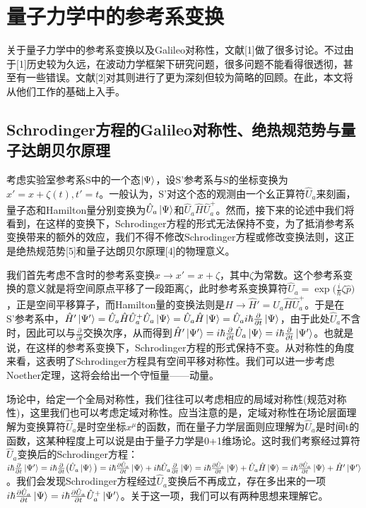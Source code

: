 \documentclass[a4paper]{article}
\begin{document}
    \section{量子力学中的参考系变换}

        关于量子力学中的参考系变换以及Galileo对称性，文献[1]做了很多讨论。不过由于[1]历史较为久远，在波动力学框架下研究问题，很多问题不能看得很透彻，甚至有一些错误。文献[2]对其则进行了更为深刻但较为简略的回顾。在此，本文将从他们工作的基础上入手。

    \subsection{Schrodinger方程的Galileo对称性、绝热规范势与量子达朗贝尔原理}
        考虑实验室参考系S中的一个态$\ket{\Psi}$，设S'参考系与S的坐标变换为$x'=x+\zeta(t), t'=t$。一般认为，S'对这个态的观测由一个幺正算符$\hat{U}_a$来刻画，量子态和Hamilton量分别变换为$\hat{U}_a\ket{\Psi}$和$\hat{U}_a\hat{H}\hat{U}_a^+$。然而，接下来的论述中我们将看到，在这样的变换下，Schrodinger方程的形式无法保持不变，为了抵消参考系变换带来的额外的效应，我们不得不修改Schrodinger方程或修改变换法则，这正是绝热规范势[5]和量子达朗贝尔原理[4]的物理意义。

        我们首先考虑不含时的参考系变换$x\rightarrow x'=x+\zeta$，其中$\zeta$为常数。这个参考系变换的意义就是将空间原点平移了一段距离$\zeta$，此时参考系变换算符$\hat{U}_a=\exp\big(\frac{i}{\hbar}\zeta\hat{p} \big)$，正是空间平移算子，而Hamilton量的变换法则是$\hat{H}\rightarrow \hat{H}'=\hat{U}_a\hat{H}\hat{U}_a^+$。于是在S'参考系中，$\hat{H}'\ket{\Psi'}=\hat{U}_a\hat{H}\hat{U}_a^+\hat{U}_a\ket{\Psi}=\hat{U}_a\hat{H}\ket{\Psi}=\hat{U}_a i\hbar\frac{\partial}{\partial t}\ket{\Psi}$，由于此处$\hat{U}_a$不含时，因此可以与$\frac{\partial}{\partial t}$交换次序，从而得到$\hat{H}'\ket{\Psi'}=i\hbar\frac{\partial}{\partial t}\hat{U}_a\ket{\Psi}=i\hbar\frac{\partial}{\partial t}\ket{\Psi'}$。也就是说，在这样的参考系变换下，Schrodinger方程的形式保持不变。从对称性的角度来看，这表明了Schrodinger方程具有空间平移对称性。我们可以进一步考虑Noether定理，这将会给出一个守恒量——动量。

        场论中，给定一个全局对称性，我们往往可以考虑相应的局域对称性(规范对称性)，这里我们也可以考虑定域对称性。应当注意的是，定域对称性在场论层面理解为变换算符$\hat{U}_a$是时空坐标$x^\mu$的函数，而在量子力学层面则应理解为$\hat{U}_a$是时间t的函数，这某种程度上可以说是由于量子力学是0+1维场论。这时我们考察经过算符$\hat{U}_a$变换后的Schrodinger方程：$i\hbar\frac{\partial}{\partial t}\ket{\Psi'} = i\hbar\frac{\partial}{\partial t}\big(\hat{U}_a\ket{\Psi}\big) = i\hbar\frac{\partial\hat{U}_a}{\partial t}\ket{\Psi} + i\hbar\hat{U}_a\frac{\partial}{\partial t}\ket{\Psi} = i\hbar\frac{\partial\hat{U}_a}{\partial t}\ket{\Psi} + \hat{U}_a\hat{H}\ket{\Psi} = i\hbar\frac{\partial\hat{U}_a}{\partial t}\ket{\Psi} + \hat{H}'\ket{\Psi'}$。我们会发现Schrodinger方程经过$\hat{U}_a$变换后不再成立，存在多出来的一项$i\hbar\frac{\partial\hat{U}_a}{\partial t}\ket{\Psi} = i\hbar\frac{\partial\hat{U}_a}{\partial t}\hat{U}_a^+\ket{\Psi'}$。关于这一项，我们可以有两种思想来理解它。
\end{document}
